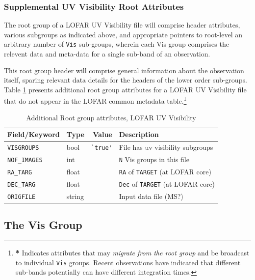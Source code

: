 \documentclass[a4paper,10pt,bibtotoc]{scrartcl}
\begin{document}


\subsubsection{Supplemental UV Visibility Root Attributes} The root
group of a LOFAR UV Visibility file will comprise header attributes,
various subgroups as indicated above, and appropriate pointers to
root-level an arbitrary number of \verb|Vis| sub-groups, wherein each
Vis group comprises the relevent data and meta-data for a single
sub-band of an observation.

 This root group header will comprise general information about the
 observation itself, sparing relevant data details for the headers of
 the lower order sub-groups.  Table \ref{tab:attributes root group}
 presents additional root group attributes for a LOFAR UV Visibility
 file that do not appear in the LOFAR common metadata
 table.\footnote{\textbf{ *} Indicates attributes that may
   \textit{migrate from the root group} and be broadcast to individual
   \texttt{Vis} groups.  Recent observations have indicated that
   different sub-bands potentially can have different integration
   times.}

\begin{table}[htbp]
  \centering
  \begin{tabular}{|llrl|}
    \hline 
    \sc Field/Keyword     & \sc Type     & \sc Value & \sc Description \\
\hline \hline 
\small{\verb|VISGROUPS|}         & bool  &\verb|`true'| & File has uv visibility subgroups \\
\small{\verb|NOF_IMAGES|}       & int    &  & \small{\texttt{N}} Vis groups in this file \\
\small{\verb|RA_TARG |}         & float  &   & \small{\texttt{RA}} of \small{\texttt{TARGET}} (at LOFAR core)\\
\small{\verb|DEC_TARG|}         & float  &   & \small{\texttt{Dec}} of \small{\texttt{TARGET}} (at LOFAR core)\\
\small{\verb|ORIGFILE|}         & string &    & Input data file (MS?) \\   
\hline
\end{tabular}
\caption{Additional Root group attributes, LOFAR UV Visibility}
\label{tab:attributes root group}
\end{table}

\subsection{The Vis Group}
\label{sec:image group}
\end{document}
